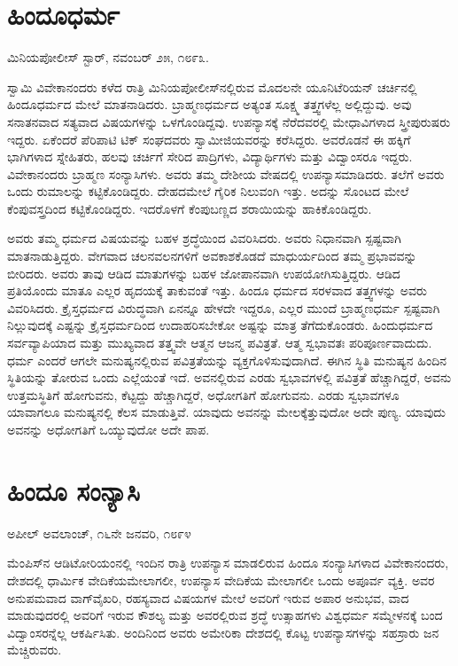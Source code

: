 \section*{ಹಿಂದೂಧರ್ಮ}

\begin{flushright}
ಮಿನಿಯಪೋಲೀಸ್ ಸ್ಟಾರ್, ನವಂಬರ್ ೨೫, ೧೮೯೩.
\end{flushright}

 ಸ್ವಾಮಿ ವಿವೇಕಾನಂದರು ಕಳೆದ ರಾತ್ರಿ ಮಿನಿಯಪೋಲೀಸ್‍ನಲ್ಲಿರುವ ಮೊದಲನೇ ಯೂನಿಟೆರಿಯನ್ ಚರ್ಚಿನಲ್ಲಿ ಹಿಂದೂಧರ್ಮದ ಮೇಲೆ ಮಾತನಾಡಿದರು. ಬ್ರಾಹ್ಮಣಧರ್ಮದ ಅತ್ಯಂತ ಸೂಕ್ಷ್ಮ ತತ್ತ್ವಗಳೆಲ್ಲ ಅಲ್ಲಿದ್ದುವು. ಅವು ಸನಾತನವಾದ ಸತ್ಯವಾದ ವಿಷಯಗಳನ್ನು ಒಳಗೊಂಡಿದ್ದವು. ಉಪನ್ಯಾಸಕ್ಕೆ ನೆರೆದವರಲ್ಲಿ ಮೇಧಾವಿಗಳಾದ ಸ್ತ್ರೀಪುರುಷರು ಇದ್ದರು. ಏಕೆಂದರೆ ಪೆರಿಪಾಟಿ ಟಿಕ್ ಸಂಘದವರು ಸ್ವಾಮೀಜಿಯವರನ್ನು ಕರೆಸಿದ್ದರು. ಅವರೊಡನೆ ಈ ಹಕ್ಕಿಗೆ ಭಾಗಿಗಳಾದ ಸ್ನೇಹಿತರು, ಹಲವು ಚರ್ಚಿಗೆ ಸೇರಿದ ಪಾದ್ರಿಗಳು, ವಿದ್ಯಾರ್ಥಿಗಳು ಮತ್ತು ವಿದ್ವಾಂಸರೂ ಇದ್ದರು. ವಿವೇಕಾನಂದರು ಬ್ರಾಹ್ಮಣ ಸಂನ್ಯಾಸಿಗಳು. ಅವರು ತಮ್ಮ ದೇಶೀಯ ವೇಷದಲ್ಲಿ ಉಪನ್ಯಾಸಮಾಡಿದರು. ತಲೆಗೆ ಅವರು ಒಂದು ರುಮಾಲನ್ನು ಕಟ್ಟಿಕೊಂಡಿದ್ದರು. ದೇಹದಮೇಲೆ ಗೈರಿಕ ನಿಲುವಂಗಿ ಇತ್ತು. ಅದನ್ನು ಸೊಂಟದ ಮೇಲೆ ಕೆಂಪುವಸ್ತ್ರದಿಂದ ಕಟ್ಟಿಕೊಂಡಿದ್ದರು. ಇದರೊಳಗೆ ಕೆಂಪುಬಣ್ಣದ ಶರಾಯಿಯನ್ನು ಹಾಕಿಕೊಂಡಿದ್ದರು. 

 ಅವರು ತಮ್ಮ ಧರ್ಮದ ವಿಷಯವನ್ನು ಬಹಳ ಶ್ರದ್ಧೆಯಿಂದ ವಿವರಿಸಿದರು. ಅವರು ನಿಧಾನವಾಗಿ ಸ್ಪಷ್ಟವಾಗಿ ಮಾತನಾಡುತ್ತಿದ್ದರು. ವೇಗವಾದ ಚಲನವಲನಗಳಿಗೆ ಅವಕಾಶಕೊಡದೆ ಮಾಧುರ್ಯದಿಂದ ತಮ್ಮ ಪ್ರಭಾವವನ್ನು ಬೀರಿದರು. ಅವರು ತಾವು ಆಡಿದ ಮಾತುಗಳನ್ನು ಬಹಳ ಜೋಪಾನವಾಗಿ ಉಪಯೋಗಿಸುತ್ತಿದ್ದರು. ಆಡಿದ ಪ್ರತಿಯೊಂದು ಮಾತೂ ಎಲ್ಲರ ಹೃದಯಕ್ಕೆ ತಾಕುವಂತೆ ಇತ್ತು. ಹಿಂದೂ ಧರ್ಮದ ಸರಳವಾದ ತತ್ತ್ವಗಳನ್ನು ಅವರು ವಿವರಿಸಿದರು. ಕ್ರೈಸ್ತಧರ್ಮದ ವಿರುದ್ಧವಾಗಿ ಏನನ್ನೂ ಹೇಳದೇ ಇದ್ದರೂ, ಎಲ್ಲರ ಮುಂದೆ ಬ್ರಾಹ್ಮಣಧರ್ಮ ಸ್ಪಷ್ಟವಾಗಿ ನಿಲ್ಲುವುದಕ್ಕೆ ಎಷ್ಟನ್ನು ಕ್ರೈಸ್ತಧರ್ಮದಿಂದ ಉದಾಹರಿಸಬೇಕೋ ಅಷ್ಟನ್ನು ಮಾತ್ರ ತೆಗೆದುಕೊಂಡರು. ಹಿಂದುಧರ್ಮದ ಸರ್ವವ್ಯಾಪಿಯಾದ ಮತ್ತು ಮುಖ್ಯವಾದ ತತ್ತ್ವವೇ ಆತ್ಮನ ಆಜನ್ಮ ಪವಿತ್ರತೆ. ಆತ್ಮ ಸ್ವಭಾವತಃ ಪರಿಪೂರ್ಣವಾದುದು. ಧರ್ಮ ಎಂದರೆ ಆಗಲೇ ಮನುಷ್ಯನಲ್ಲಿರುವ ಪವಿತ್ರತೆಯನ್ನು ವ್ಯಕ್ತಗೊಳಿಸುವುದಾಗಿದೆ. ಈಗಿನ ಸ್ಥಿತಿ ಮನುಷ್ಯನ ಹಿಂದಿನ ಸ್ಥಿತಿಯನ್ನು ತೋರುವ ಒಂದು ಎಲ್ಲೆಯಂತೆ ಇದೆ. ಅವನಲ್ಲಿರುವ ಎರಡು ಸ್ವಭಾವಗಳಲ್ಲಿ ಪವಿತ್ರತೆ ಹೆಚ್ಚಾಗಿದ್ದರೆ, ಅವನು ಉತ್ತಮಸ್ಥಿತಿಗೆ ಹೋಗುವನು, ಕೆಟ್ಟದ್ದು ಹೆಚ್ಚಾಗಿದ್ದರೆ, ಅಧೋಗತಿಗೆ ಹೋಗುವನು. ಎರಡು ಸ್ವಭಾವಗಳೂ ಯಾವಾಗಲೂ ಮನುಷ್ಯನಲ್ಲಿ ಕೆಲಸ ಮಾಡುತ್ತಿವೆ. ಯಾವುದು ಅವನನ್ನು ಮೇಲಕ್ಕೆತ್ತುವುದೋ ಅದೇ ಪುಣ್ಯ. ಯಾವುದು ಅವನನ್ನು ಅಧೋಗತಿಗೆ ಒಯ್ಯುವುದೋ ಅದೇ ಪಾಪ.


\section*{ಹಿಂದೂ ಸಂನ್ಯಾಸಿ}

\begin{flushright}
ಅಪೀಲ್ ಅವಲಾಂಚ್, ೧೬ನೇ ಜನವರಿ, ೧೮೯೪
\end{flushright}

 ಮೆಂಪಿಸ್‍ನ ಆಡಿಟೋರಿಯಂನಲ್ಲಿ ಇಂದಿನ ರಾತ್ರಿ ಉಪನ್ಯಾಸ ಮಾಡಲಿರುವ ಹಿಂದೂ ಸಂನ್ಯಾಸಿಗಳಾದ ವಿವೇಕಾನಂದರು, ದೇಶದಲ್ಲಿ ಧಾರ್ಮಿಕ ವೇದಿಕೆಯ\break ಮೇಲಾಗಲೀ, ಉಪನ್ಯಾಸ ವೇದಿಕೆಯ ಮೇಲಾಗಲೀ ಒಂದು ಅಪೂರ್ವ ವ್ಯಕ್ತಿ. ಅವರ ಅನುಪಮವಾದ ವಾಗ್‍ವೈಖರಿ, ರಹಸ್ಯವಾದ ವಿಷಯಗಳ ಮೇಲೆ ಅವರಿಗೆ ಇರುವ ಅಪಾರ ಅನುಭವ, ವಾದ ಮಾಡುವುದರಲ್ಲಿ ಅವರಿಗೆ ಇರುವ ಕೌಶಲ್ಯ ಮತ್ತು ಅವರಲ್ಲಿರುವ ಶ್ರದ್ಧೆ ಉತ್ಸಾಹಗಳು ವಿಶ್ವಧರ್ಮ ಸಮ್ಮೇಳನಕ್ಕೆ ಬಂದ ವಿದ್ವಾಂಸರನ್ನೆಲ್ಲ ಆಕರ್ಷಿಸಿತು. ಅಂದಿನಿಂದ ಅವರು ಅಮೇರಿಕಾ ದೇಶದಲ್ಲಿ ಕೊಟ್ಟ ಉಪನ್ಯಾಸಗಳನ್ನು ಸಹಸ್ರಾರು ಜನ ಮೆಚ್ಚಿರುವರು. 

